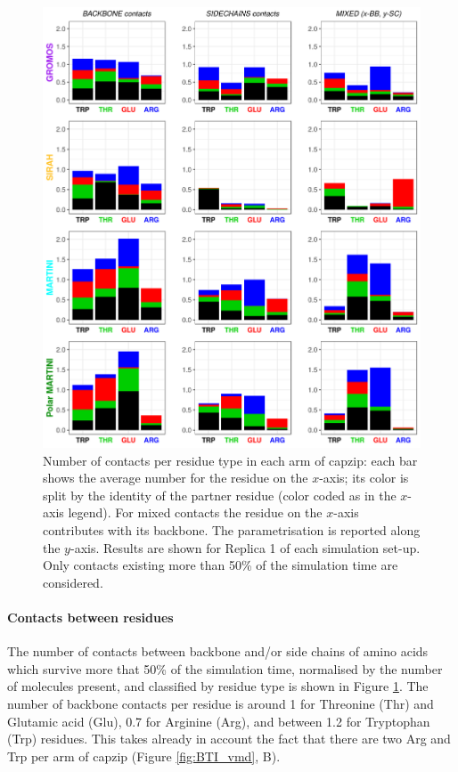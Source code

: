\begin{figure}[p!]
\centering
\includegraphics[width=0.95\linewidth]{3results_capsule/pics/new_rep1_allFF.png}
\caption[Contacts between molecules during simulations of the buckyball]{Number of contacts per residue type in each arm of capzip: each bar shows the average number for the residue on the $x$-axis; its color is split by the identity of the partner residue (color coded as in the $x$-axis legend). For mixed contacts the residue on the $x$-axis contributes with its backbone. The parametrisation is reported along the $y$-axis. Results are shown for Replica 1 of each simulation set-up. Only contacts existing more than 50\% of the simulation time are considered.}
\label{fig:BTI_cont}
\end{figure}

\paragraph{Contacts between residues} The number of contacts between backbone and/or side chains of amino acids which survive more that 50\% of the simulation time, normalised by the number of molecules present, and classified by residue type is shown in Figure \ref{fig:BTI_cont}. 
%
The number of backbone contacts per residue is around 1 for Threonine (Thr) and Glutamic acid (Glu), 0.7 for Arginine (Arg), and between 1.2 for Tryptophan (Trp) residues.
%
This takes already in account the fact that there are two Arg and Trp per arm of capzip (Figure \ref{fig:BTI_vmd}, B).

